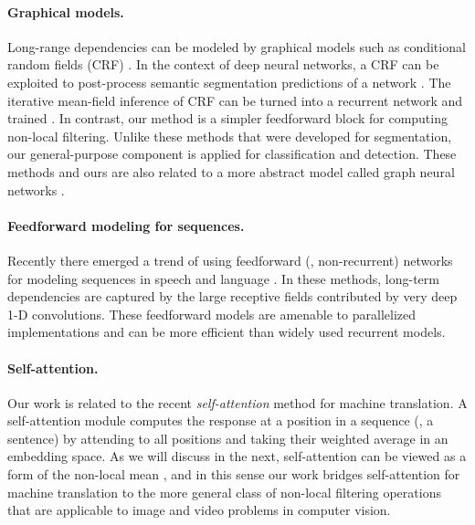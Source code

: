 \documentclass[10pt,twocolumn,letterpaper]{article}
\begin{document}
\vspace{-.2em}
\paragraph{Graphical models.} Long-range dependencies can be modeled by graphical models such as conditional random fields (CRF) \cite{Lafferty2001,Kraehenbuehl2011}. In the context of deep neural networks, a CRF can be exploited to post-process semantic segmentation predictions of a network \cite{Chen2014}. The iterative mean-field inference of CRF can be turned into a recurrent network and trained \cite{Zheng2015,Schwing2015,Chandra2017,Harley2017,Liu2017}. 
In contrast, our method is a simpler feedforward block for computing non-local filtering. 
Unlike these methods that were developed for segmentation, our general-purpose component is applied for classification and detection. These methods and ours are also related to a more abstract model called graph neural networks \cite{Scarselli2009}.

\vspace{-.2em}
\paragraph{Feedforward modeling for sequences.} Recently there emerged a trend of using feedforward (\ie, non-recurrent) networks for modeling sequences in speech and language \cite{Oord2016,Xiong2016,Gehring2017}. In these methods, long-term dependencies are captured by the large receptive fields contributed by very deep 1-D convolutions. These feedforward models are amenable to parallelized implementations and can be more efficient than widely used recurrent models.

\vspace{-.2em}
\paragraph{Self-attention.} Our work is related to the recent \emph{self-attention} \cite{Vaswani2017} method for machine translation. A self-attention module computes the response at a position in a sequence (\eg, a sentence) by attending to all positions and taking their weighted average in an embedding space. As we will discuss in the next, self-attention can be viewed as a form of the non-local mean \cite{Buades2005}, and in this sense our work bridges self-attention for machine translation to the more general class of non-local filtering operations that are applicable to image and video problems in computer vision.
\end{document}
